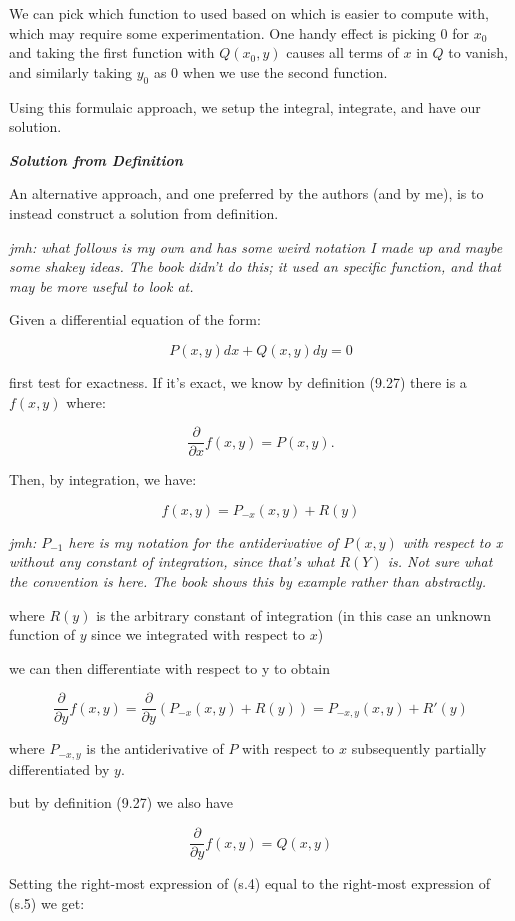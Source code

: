\documentclass{article}
\begin{document}
We can pick which function to used based on which is easier to compute with, which may require some experimentation. One handy effect is picking $0$ for $x_0$ and taking the first function with $Q(x_0,y)$ causes all terms of $x$ in $Q$ to vanish, and similarly taking $y_0$ as $0$ when we use the second function.

Using this formulaic approach, we setup the integral, integrate, and have our solution.

\emph{\textbf{Solution from Definition}}

An alternative approach, and one preferred by the authors (and by me), is to instead construct a solution from definition.

\emph{jmh: what follows is my own and has some weird notation I made up and maybe some shakey ideas. The book
didn't do this; it used an specific function, and that may be more useful to look at.}

Given a differential equation of the form:

\[ \tag{s.1} P(x,y)dx + Q(x,y)dy = 0 \]

first test for exactness. If it's exact, we know by definition (9.27) there is a $f(x,y)$ where:

\[ \tag{s.2} \frac{\partial}{\partial x} f(x,y) = P(x,y). \]

Then, by integration, we have:

\[ \tag{s.3} f(x,y) = P_{-x}(x,y) + R(y) \]

\emph{jmh: $P_{-1}$ here is my notation for the antiderivative of $P(x,y)$ with respect to x without any constant of integration, since that's what $R(Y)$ is. Not sure what the convention is here. The book shows this by example rather than abstractly.}

where $R(y)$ is the arbitrary constant of integration (in this case an unknown function of $y$ since we integrated with respect to $x$)

we can then differentiate with respect to y to obtain

\[ \tag{s.4} \frac{\partial}{\partial y} f(x,y) = \frac{\partial}{\partial y}( P_{-x}(x,y) + R(y)) = P_{-x,y}(x,y) + R'(y) \] 

where $P_{-x,y}$ is the antiderivative of $P$ with respect to $x$ subsequently partially differentiated by $y$.

but by definition (9.27) we also have

\[ \tag{s.5} \frac{\partial}{\partial y} f(x,y) = Q(x,y) \]

Setting the right-most expression of (s.4) equal to the right-most expression of (s.5) we get:
\end{document}

